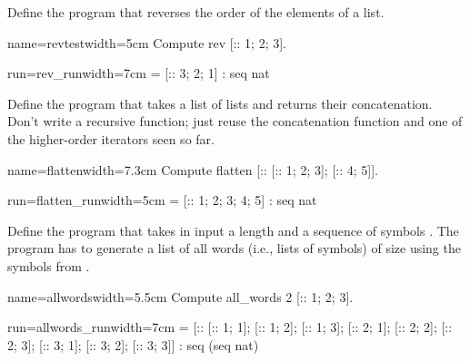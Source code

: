 \begin{Exercise}[label=ex:rev,difficulty=0,title={List reversal}]
Define the program  that reverses the order of the elements
of a list.

\begin{coq-left}{name=revtest}{width=5cm}
Compute
  rev [:: 1; 2; 3].
\end{coq-left}
\begin{coqout-right}{run=rev_run}{width=7cm}
 = [:: 3; 2; 1]
 : seq nat
\end{coqout-right}
\end{Exercise}

\begin{Exercise}[label=ex:flatten,difficulty=1,title={List flattening}]
Define the program  that takes a list of lists and returns
their concatenation.  Don't write a recursive function; just reuse
the concatenation function and one of the higher-order iterators
seen so far.

\begin{coq-left}{name=flatten}{width=7.3cm}
Compute
 flatten [:: [:: 1; 2; 3]; [:: 4; 5]].
\end{coq-left}
\begin{coqout-right}{run=flatten_run}{width=5cm}
 = [:: 1; 2; 3; 4; 5]
 : seq nat
\end{coqout-right}
\end{Exercise}


\begin{Exercise}[label=ex:allwords,difficulty=2,title={All words of size n}]
Define the  program that takes in input a
length  and a sequence of symbols .
The program has to generate a list of all words (i.e., lists
of symbols) of size  using the symbols from .

\begin{coq-left}{name=allwords}{width=5.5cm}
Compute
  all_words 2 [:: 1; 2; 3].
$~$
$~$
\end{coq-left}
\begin{coqout-right}{run=allwords_run}{width=7cm}
 = [:: [:: 1; 1]; [:: 1; 2]; [:: 1; 3];
       [:: 2; 1]; [:: 2; 2]; [:: 2; 3];
       [:: 3; 1]; [:: 3; 2]; [:: 3; 3]]
 : seq (seq nat)
\end{coqout-right}
\end{Exercise}


